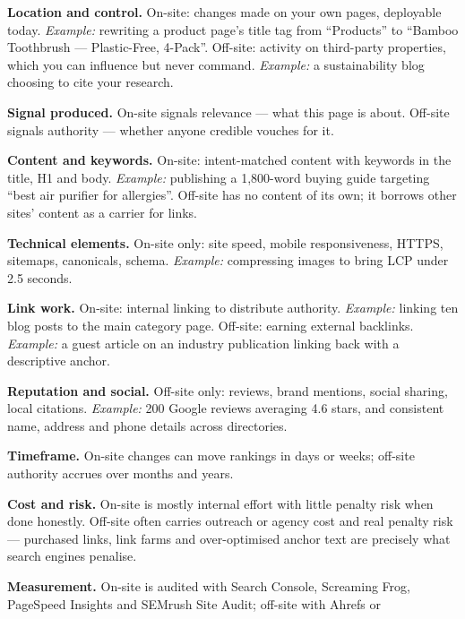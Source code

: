 \begin{qlist}
\begin{apts}
\item \textbf{Location and control.} On-site: changes made on your own pages,
      deployable today. \emph{Example:} rewriting a product page's title tag
      from ``Products'' to ``Bamboo Toothbrush --- Plastic-Free, 4-Pack''.
      Off-site: activity on third-party properties, which you can influence but
      never command. \emph{Example:} a sustainability blog choosing to cite your
      research.
\item \textbf{Signal produced.} On-site signals relevance --- what this page is
      about. Off-site signals authority --- whether anyone credible vouches for
      it.
\item \textbf{Content and keywords.} On-site: intent-matched content with
      keywords in the title, H1 and body. \emph{Example:} publishing a
      1{,}800-word buying guide targeting ``best air purifier for allergies''.
      Off-site has no content of its own; it borrows other sites' content as a
      carrier for links.
\item \textbf{Technical elements.} On-site only: site speed, mobile
      responsiveness, HTTPS, sitemaps, canonicals, schema. \emph{Example:}
      compressing images to bring LCP under 2.5 seconds.
\item \textbf{Link work.} On-site: internal linking to distribute authority.
      \emph{Example:} linking ten blog posts to the main category page.
      Off-site: earning external backlinks. \emph{Example:} a guest article on
      an industry publication linking back with a descriptive anchor.
\item \textbf{Reputation and social.} Off-site only: reviews, brand mentions,
      social sharing, local citations. \emph{Example:} 200 Google reviews
      averaging 4.6 stars, and consistent name, address and phone details across
      directories.
\item \textbf{Timeframe.} On-site changes can move rankings in days or weeks;
      off-site authority accrues over months and years.
\item \textbf{Cost and risk.} On-site is mostly internal effort with little
      penalty risk when done honestly. Off-site often carries outreach or
      agency cost and real penalty risk --- purchased links, link farms and
      over-optimised anchor text are precisely what search engines penalise.
\item \textbf{Measurement.} On-site is audited with Search Console, Screaming
      Frog, PageSpeed Insights and SEMrush Site Audit; off-site with Ahrefs or

\end{apts}
\end{qlist}
